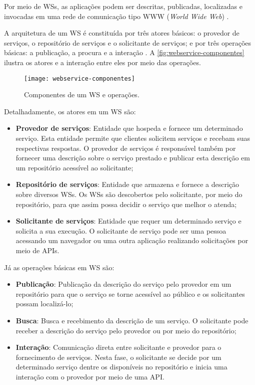 Por meio de WSs, as aplicações podem ser descritas, publicadas, localizadas e invocadas em uma rede de comunicação tipo WWW (\textit{World Wide Web}) \cite{souit2013soa}.

A arquitetura de um WS é constituída por três atores básicos: o provedor de serviços, o repositório de serviços e o solicitante de serviços; e por três operações básicas: a publicação, a procura e a interação \cite{gottschalk2002webservices}. A \autoref{fig:webservice-componentes} ilustra os atores e a interação entre eles por meio das operações.

\begin{figure}[t]
	\centering
	\texttt{[image: webservice-componentes]}
	\caption{Componentes de um WS e operações.}
	\label{fig:webservice-componentes}
\end{figure}

Detalhadamente, os atores em um WS são:

\begin{itemize}
	\item \textbf{Provedor de serviços}: Entidade que hospeda e fornece um determinado serviço. Esta entidade permite que clientes solicitem serviços e recebam suas respectivas respostas. O provedor de serviços é responsável também por fornecer uma descrição sobre o serviço prestado e publicar esta descrição em um repositório acessível ao solicitante;

	\item \textbf{Repositório de serviços}: Entidade que armazena e fornece a descrição sobre diversos WSs. Os WSs são descobertos pelo solicitante, por meio do repositório, para que assim possa decidir o serviço que melhor o atenda;

	\item \textbf{Solicitante de serviços}: Entidade que requer um determinado serviço e solicita a sua execução. O solicitante de serviço pode ser uma pessoa acessando um navegador ou uma outra aplicação realizando solicitações por meio de APIs.
\end{itemize}

Já as operações básicas em WS são:

\begin{itemize}
	\item \textbf{Publicação}: Publicação da descrição do serviço pelo provedor em um repositório para que o serviço se torne acessível ao público e os solicitantes possam localizá-lo;

	\item \textbf{Busca}: Busca e recebimento da descrição de um serviço. O solicitante pode receber a descrição do serviço pelo provedor ou por meio do repositório;

	\item \textbf{Interação}: Comunicação direta entre solicitante e provedor para o fornecimento de serviços. Nesta fase, o solicitante se decide por um determinado serviço dentre os disponíveis no repositório e inicia uma interação com o provedor por meio de uma API.
\end{itemize}

